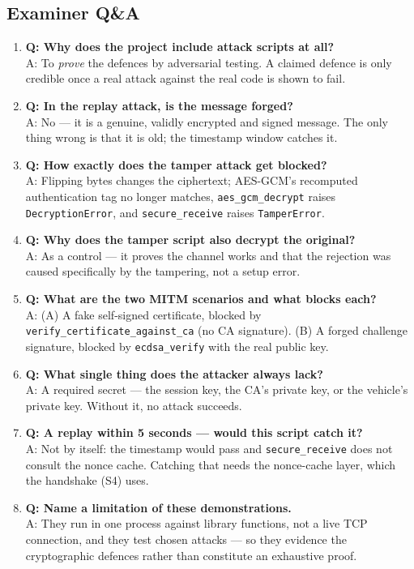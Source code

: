 \documentclass[11pt,a4paper]{article}
\begin{document}
\subsection{Examiner Q\&A}
\begin{enumerate}
  \item \textbf{Q: Why does the project include attack scripts at all?}\\
        A: To \emph{prove} the defences by adversarial testing. A claimed defence
        is only credible once a real attack against the real code is shown to
        fail.
  \item \textbf{Q: In the replay attack, is the message forged?}\\
        A: No --- it is a genuine, validly encrypted and signed message. The only
        thing wrong is that it is old; the timestamp window catches it.
  \item \textbf{Q: How exactly does the tamper attack get blocked?}\\
        A: Flipping bytes changes the ciphertext; AES-GCM's recomputed
        authentication tag no longer matches, \texttt{aes\_gcm\_decrypt} raises
        \texttt{DecryptionError}, and \texttt{secure\_receive} raises
        \texttt{TamperError}.
  \item \textbf{Q: Why does the tamper script also decrypt the original?}\\
        A: As a control --- it proves the channel works and that the rejection
        was caused specifically by the tampering, not a setup error.
  \item \textbf{Q: What are the two MITM scenarios and what blocks each?}\\
        A: (A) A fake self-signed certificate, blocked by
        \texttt{verify\_certificate\_against\_ca} (no CA signature). (B) A forged
        challenge signature, blocked by \texttt{ecdsa\_verify} with the real
        public key.
  \item \textbf{Q: What single thing does the attacker always lack?}\\
        A: A required secret --- the session key, the CA's private key, or the
        vehicle's private key. Without it, no attack succeeds.
  \item \textbf{Q: A replay within 5 seconds --- would this script catch it?}\\
        A: Not by itself: the timestamp would pass and \texttt{secure\_receive}
        does not consult the nonce cache. Catching that needs the nonce-cache
        layer, which the handshake (S4) uses.
  \item \textbf{Q: Name a limitation of these demonstrations.}\\
        A: They run in one process against library functions, not a live TCP
        connection, and they test chosen attacks --- so they evidence the
        cryptographic defences rather than constitute an exhaustive proof.
\end{enumerate}
\end{document}
